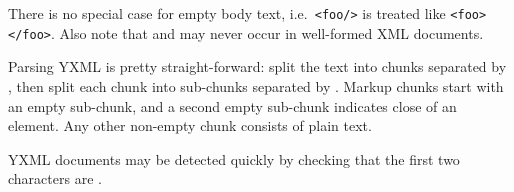 \begin{isabellebody}
\begin{isamarkuptext}
\begin{enumerate}
  There is no special case for empty body text, i.e.\ \verb|<foo/>| is treated like \verb|<foo></foo>|.  Also note that
   and  may never occur in
  well-formed XML documents.

  \end{enumerate}

  Parsing YXML is pretty straight-forward: split the text into chunks
  separated by , then split each chunk into
  sub-chunks separated by .  Markup chunks start
  with an empty sub-chunk, and a second empty sub-chunk indicates
  close of an element.  Any other non-empty chunk consists of plain
  text.

  YXML documents may be detected quickly by checking that the first
  two characters are .%
\end{isamarkuptext}%
\isamarkuptrue%
%
\isadelimtheory
%
\endisadelimtheory
%
\isatagtheory
{}\isamarkupfalse%
%
\endisatagtheory
{\isafoldtheory}%
%
\isadelimtheory
%
\endisadelimtheory
\end{isabellebody}%
